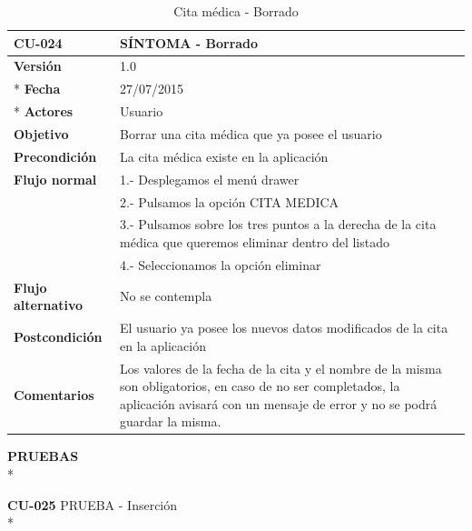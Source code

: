 \documentclass[../pfc.tex]{subfiles}
\begin{document}
		\begin{table}[H]
			\centering
			\begin{tabular}[t]{|p{3cm}|p{9.5cm}|}
				\hline \textbf{CU-024} & \textbf{SÍNTOMA - Borrado} \\*
				\hline\hline \textbf{Versión} & 1.0 \\ *
				\hline\hline \textbf{Fecha} & 27/07/2015 \\ *
				\hline\textbf{Actores} 	& Usuario\\*
				\hline \textbf{Objetivo} & Borrar una cita médica que ya posee el usuario\\* 			
				\hline \textbf{Precondición} & La cita médica existe en la aplicación\\* 
				\hline \textbf{Flujo normal} & 1.- Desplegamos el menú drawer \\* 
				& 2.- Pulsamos la opción CITA MEDICA\\*	
				& 3.- Pulsamos sobre los tres puntos a la derecha de la cita médica que queremos eliminar dentro del listado\\*	
				& 4.- Seleccionamos la opción eliminar\\*	
				\hline \textbf{Flujo alternativo} & No se contempla \\* 
				\hline \textbf{Postcondición} & El usuario ya posee los nuevos datos modificados de la cita en la aplicación \\* 
				\hline \textbf{Comentarios}   & Los valores de la fecha de la cita y el nombre de la misma son obligatorios, en caso de no ser completados, la aplicación avisará con un mensaje de error y no se podrá guardar la misma.\\*
				\hline
			\end{tabular}
			\caption{Cita médica - Borrado}
			\label{tabla:caso024}
		\end{table}
		
		
		
	

	

	
		
		
		
		\textbf{PRUEBAS}\\*
		
		\textbf{CU-025}	PRUEBA - Inserción\\*
		
\end{document}
